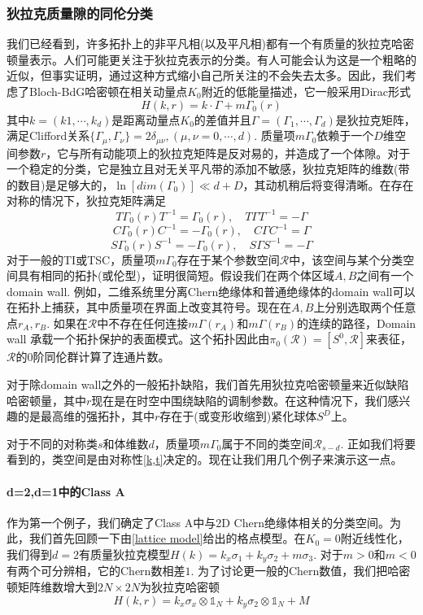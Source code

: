 \documentclass{article}
\numberwithin{equation}{subsection}
\begin{document}
\subsubsection{狄拉克质量隙的同伦分类}
我们已经看到，许多拓扑上的非平凡相(以及平凡相)都有一个有质量的狄拉克哈密顿量表示。人们可能更关注于狄拉克表示的分类。有人可能会认为这是一个粗略的近似，但事实证明，通过这种方式缩小自己所关注的不会失去太多。因此，我们考虑了Bloch-BdG哈密顿在相关动量点$K_0$附近的低能量描述，它一般采用Dirac形式  
\begin{equation}
    H(k,r)=k\cdot\Gamma+m\Gamma_0(r)
\end{equation}
其中$k=(k1,\cdots,k_d)$是距离动量点$K_0$的差值并且$\Gamma=(\Gamma_1,\cdots,\Gamma_d)$是狄拉克矩阵，满足Clifford关系$\{\Gamma_\mu,\Gamma_\nu\}=2\delta_{\mu\nu},(\mu,\nu=0,\cdots,d)$. 质量项$m\Gamma_0$依赖于一个$D$维空间参数$r$，它与所有动能项上的狄拉克矩阵是反对易的，并造成了一个体隙。对于一个稳定的分类，它是独立且对无关平凡带的添加不敏感，狄拉克矩阵的维数(带的数目)是足够大的，$\ln[dim(\Gamma_0)]\ll d+D$，其动机稍后将变得清晰。在存在对称的情况下，狄拉克矩阵满足
\begin{equation}\label{k,t}
    T\Gamma_0(r)T^{-1}=\Gamma_0(r),\quad T\Gamma T^{-1}=-\Gamma
\end{equation}
\begin{equation}
    C\Gamma_0(r)C^{-1}=-\Gamma_0(r),\quad C\Gamma C^{-1}=\Gamma
\end{equation}
\begin{equation}
    S\Gamma_0(r)S^{-1}=-\Gamma_0(r),\quad S\Gamma S^{-1}=-\Gamma
\end{equation}
对于一般的TI或TSC，质量项$mΓ_0$存在于某个参数空间$\mathcal{R}$中，该空间与某个分类空间具有相同的拓扑(或伦型)，证明很简短。假设我们在两个体区域$A,B$之间有一个domain wall. 例如，二维系统里分离Chern绝缘体和普通绝缘体的domain wall可以在拓扑上捕获，其中质量项在界面上改变其符号。现在在$A,B$上分别选取两个任意点$r_A,r_B$. 如果在$\mathcal{R}$中不存在任何连接$m\Gamma(r_A)$和$m\Gamma(r_B)$的连续的路径，Domain wall 承载一个拓扑保护的表面模式。这个拓扑因此由$\pi_0(\mathcal{R})=[S^0,\mathcal{R}]$来表征，$\mathcal{R}$的$0$阶同伦群计算了连通片数。

对于除domain wall之外的一般拓扑缺陷，我们首先用狄拉克哈密顿量来近似缺陷哈密顿量，其中$r$现在是在时空中围绕缺陷的调制参数。在这种情况下，我们感兴趣的是最高维的强拓扑，其中$r$存在于(或变形收缩到)紧化球体$S^D$上。

对于不同的对称类$s$和体维数$d$，质量项$m\Gamma_0$属于不同的类空间$\mathcal{R}_{s-d}$. 正如我们将要看到的，类空间是由对称性\eqref{k,t}决定的。现在让我们用几个例子来演示这一点。
\paragraph{d=2,d=1中的Class A}
作为第一个例子，我们确定了Class A中与2D Chern绝缘体相关的分类空间。为此，我们首先回顾一下由\eqref{lattice model}给出的格点模型。在$K_0=0$附近线性化，我们得到$d=2$有质量狄拉克模型$H(k)=k_x\sigma_1+k_y\sigma_2+m\sigma_3$. 对于$m>0$和$m<0$有两个可分辨相，它的Chern数相差$1$. 为了讨论更一般的Chern数值，我们把哈密顿矩阵维数增大到$2N\times 2N$为狄拉克哈密顿
\begin{equation}
    H(k,r)=k_x\sigma_x\otimes\mathbb{1}_N+k_y\sigma_2\otimes\mathbb{1}_N+M
\end{equation}
\end{document}
